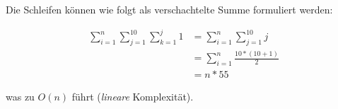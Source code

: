 Die Schleifen können wie folgt als verschachtelte Summe formuliert werden:

\begin{equation}
    \begin{split}
        \sum_{i=1}^{n}  \sum_{j = 1}^{10} \sum_{k=1}^j 1 &= \sum_{i=1}^{n}  \sum_{j = 1}^{10} j \\
        &= \sum_{i=1}^{n}  \frac{10*(10+1)}{2}  \\
        &= n * 55
    \end{split}
\end{equation}

was zu $O(n)$ führt (\textit{lineare} Komplexität).